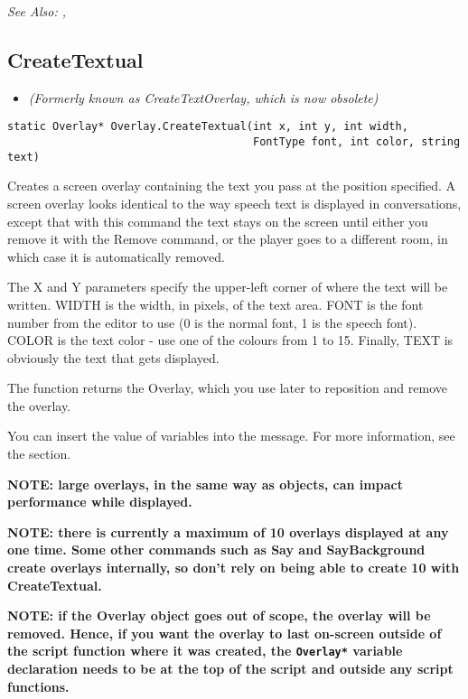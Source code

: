\it{See Also:} ,


\subsection{CreateTextual}\label{Overlay.CreateTextual}%

\begin{itemize}
\item \it{(Formerly known as CreateTextOverlay, which is now obsolete)}
\end{itemize}

\begin{verbatim}
static Overlay* Overlay.CreateTextual(int x, int y, int width,
                                      FontType font, int color, string text)
\end{verbatim}
Creates a screen overlay containing the text you pass at the position
specified. A screen overlay looks identical to the way speech text is
displayed in conversations, except that with this command the text stays
on the screen until either you remove it with the Remove command, or the player
goes to a different room, in which case it is automatically removed.

The X and Y parameters specify the upper-left corner of where the text
will be written. WIDTH is the width, in pixels, of the text area. FONT is
the font number from the editor to use (0 is the normal font, 1 is the speech
font). COLOR is the text color - use one of the colours from 1 to 15.
Finally, TEXT is obviously the text that gets displayed.

The function returns the Overlay, which you use later to reposition
and remove the overlay.

You can insert the value of variables into the message. For more information,
see the  section.

\bf{NOTE:} large overlays, in the same way as objects, can impact performance
while displayed.

\bf{NOTE:} there is currently a maximum of 10 overlays displayed at any one time. Some other
commands such as Say and SayBackground create overlays internally,
so don't rely on being able to create 10 with CreateTextual.

\bf{NOTE:} if the Overlay object goes out of scope, the overlay will be removed. Hence,
if you want the overlay to last on-screen outside of the script function where it
was created, the \verb$Overlay*$ variable declaration needs to be at the top of
the script and outside any script functions.

